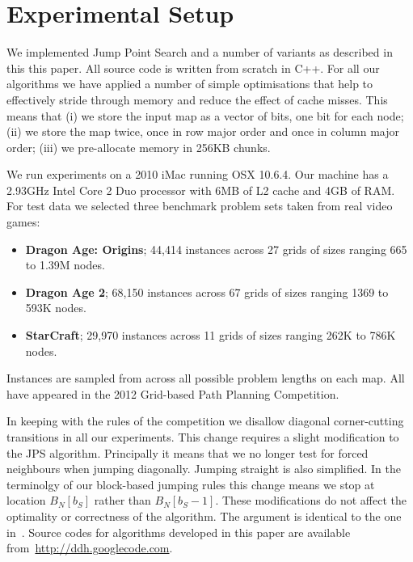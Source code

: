 

\section{Experimental Setup}
\label{sec::setup}
We implemented Jump Point Search and a number of variants as described
in this this paper. All source code is written from scratch in C++.
For all our algorithms we have applied a number of simple optimisations 
that help to effectively stride through memory and reduce the effect of 
cache misses.
This means that (i) we store the input map as a vector of bits, one bit 
for each node; (ii) we store the map twice, once in row major order and 
once in column major order; (iii) we pre-allocate memory in 256KB chunks.

We run experiments on a 2010 iMac running OSX 10.6.4. Our machine has 
a 2.93GHz Intel Core 2 Duo processor with 6MB of L2 cache and 4GB of RAM.
For test data we selected three benchmark problem sets taken from
real video games: 
\begin{itemize}
\item \textbf{Dragon Age: Origins}; 44,414 instances across 27 grids of 
sizes ranging 665 to 1.39M nodes.
\item \textbf{Dragon Age 2}; 68,150 instances across 67 grids of sizes 
ranging 1369 to 593K nodes.
\item \textbf{StarCraft}; 29,970 instances across 11 grids of sizes 
ranging 262K to 786K nodes.
\end{itemize}
Instances are sampled from across all possible problem lengths on each map.
All have appeared in the 2012 Grid-based Path Planning Competition. 

In keeping with the rules of the competition we disallow diagonal
corner-cutting transitions in all our experiments.  This change requires a
slight modification to the JPS algorithm.  Principally it means that we no
longer test for forced neighbours when jumping diagonally.
Jumping straight is also simplified. In the terminolgy of our block-based
jumping rules this change means we stop at location $B_N[b_S]$ rather than
$B_N[b_S-1]$.  These modifications do not affect the optimality or 
correctness of the algorithm. The argument is identical to the one
in~\cite{harabor11b}.
Source codes for algorithms developed in this paper are available
from~{\small \url{http://ddh.googlecode.com}}.

